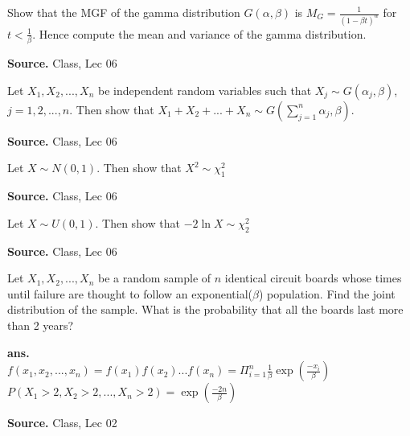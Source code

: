 \documentclass[12pt,twoside]{report}
\newenvironment*{ans}{\textbf{ans.}\space\em\\}{\par}
\newenvironment*{source}{\hfill\scriptsize\textbf{Source.}\space}{\par}
\begin{document}
\begin{samepage}
\begin{ex}
Show that the MGF of the gamma distribution $G(\alpha, \beta)$ is $M_G = \displaystyle \frac{1}{(1 - \beta t)^\alpha}$ for $t < \displaystyle \frac{1}{\beta}$. Hence compute the mean and variance of the gamma distribution.
\end{ex}
\begin{source}
Class, Lec 06
\end{source}
\end{samepage}

\begin{samepage}
\begin{ex}
Let $X_1, X_2, ..., X_n$ be independent random variables such that  $X_j \sim G(\alpha_j, \beta)$, $j = 1, 2, ...,n$.
Then show that $X_1 +  X_2 + ... + X_n \sim G(\sum_{j=1}^n \alpha_j , \beta)$.
\end{ex}
\begin{source}
Class, Lec 06
\end{source}
\end{samepage}

\begin{samepage}
\begin{ex}
Let $X \sim N(0,1)$. Then show that $X^2 \sim \chi_1^2$
\end{ex}
\begin{source}
Class, Lec 06
\end{source}
\end{samepage}

\begin{samepage}
\begin{ex}
Let $X \sim U(0,1)$. Then show that $-2 \ln X \sim \chi^2_2$
\end{ex}
\begin{source}
Class, Lec 06
\end{source}
\end{samepage}

\begin{ex}
Let $X_1, X_2, ..., X_n$ be a random sample of $n$ identical circuit boards whose times until failure are thought to follow an exponential($\beta$) population. Find the joint distribution of the sample. What is the probability that all the boards last more than 2 years?
\end{ex}
\begin{ans}
$f(x_1, x_2, ..., x_n)  = f(x_1) f(x_2) ... f(x_n) = \Pi_{i=1}^n \frac{1}{\beta} \exp(\frac{-x_i}{\beta})$ \\
$P(X_1 > 2, X_2 > 2, ..., X_n > 2) = \exp(\frac{-2n}{\beta})$
\end{ans}
\begin{source}
    Class, Lec 02
\end{source}
\end{document}
